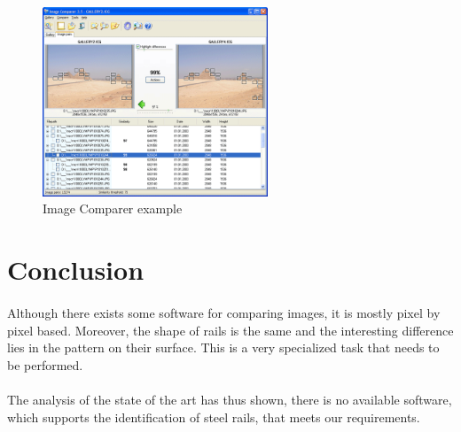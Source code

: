 \begin{figure}[h]
	\centering
	\includegraphics[width=0.6\textwidth]{images/image_comparer}
	\caption{Image Comparer example}
	\label{fig:image_comparator}
\end{figure}


\section{Conclusion}
\paragraph{}
Although there exists some software for comparing images, it is mostly pixel by pixel based. Moreover, the shape of rails is the same and the interesting difference lies in the pattern on their surface. This is a very specialized task that needs to be performed.

\paragraph{}
The analysis of the state of the art has thus shown, there is no available software, which supports the identification of steel rails, that meets our requirements.